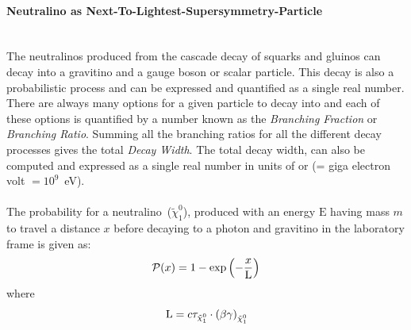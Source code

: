 {%
\paragraph{Neutralino as Next-To-Lightest-Supersymmetry-Particle}\mbox{}\\
The neutralinos produced from the cascade decay of squarks and gluinos can decay into a gravitino and a gauge boson or scalar particle. This decay is also a probabilistic process and can be expressed and quantified as a single real number. 
 There are always many options for a given particle to decay into and each of these options is quantified by a number known as the \textit{Branching  Fraction} or \textit{Branching Ratio}. Summing all the branching ratios for all the different decay processes gives the total \textit{Decay Width}. The total decay width, can also be computed and expressed as a single real number in units of \GeV or \MeV (\GeV = giga electron volt $=10^{9}$~eV). 
\paragraph*{}
The probability for a neutralino~($\tilde{\chi}^{0}_{1}$), produced with an energy $\displaystyle{\mathrm{E}}$ having mass $m$ to travel a distance $x$ before decaying to a photon and gravitino in the laboratory frame is given as:
\begin{equation}{\label{eq:prop}}
\displaystyle{\mathcal{P}(x) = 1 - \exp{\left(- \frac{x}{\mathrm{L}} \right)} }
\end{equation}
where
\begin{equation}{\label{eq:dl}}
\displaystyle{\mathrm{L} = c\tau_{\tilde{\chi}^{0}_{1}}\cdot\left(\beta\gamma\right)_{\tilde{\chi}^{0}_{1}}}
\end{equation}

}

